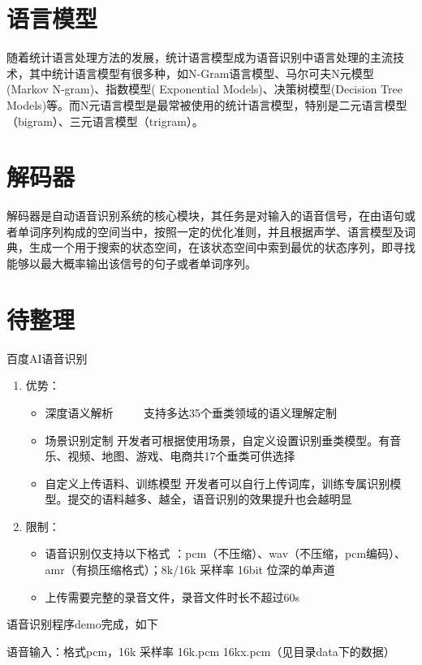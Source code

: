 \documentclass[10pt,a4paper]{ctexbook}
\begin{document}
\section{语言模型}
随着统计语言处理方法的发展，统计语言模型成为语音识别中语言处理的主流技术，其中统计语言模型有很多种，如N-Gram语言模型、马尔可夫N元模型(Markov N-gram)、指数模型( Exponential Models)、决策树模型(Decision Tree Models)等。而N元语言模型是最常被使用的统计语言模型，特别是二元语言模型（bigram）、三元语言模型（trigram）。

\section{解码器}
解码器是自动语音识别系统的核心模块，其任务是对输入的语音信号，在由语句或者单词序列构成的空间当中，按照一定的优化准则，并且根据声学、语言模型及词典，生成一个用于搜索的状态空间，在该状态空间中索到最优的状态序列，即寻找能够以最大概率输出该信号的句子或者单词序列。


\section{待整理}
百度AI语音识别
\begin{enumerate}
\item 优势：
    \begin{itemize}
    \item 深度语义解析
　　    \subitem 支持多达35个垂类领域的语义理解定制
    \item 场景识别定制
        \subitem 开发者可根据使用场景，自定义设置识别垂类模型。有音乐、视频、地图、游戏、电商共17个垂类可供选择
    \item 自定义上传语料、训练模型
        \subitem 开发者可以自行上传词库，训练专属识别模型。提交的语料越多、越全，语音识别的效果提升也会越明显
    \end{itemize}

\item 限制：
    \begin{itemize}
    \item 语音识别仅支持以下格式 ：pcm（不压缩）、wav（不压缩，pcm编码）、amr（有损压缩格式）；8k/16k 采样率 16bit 位深的单声道
    \item 上传需要完整的录音文件，录音文件时长不超过60s
    \end{itemize}
\end{enumerate}

语音识别程序demo完成，如下

语音输入：格式pcm，16k 采样率 16k.pcm 16kx.pcm（见目录data下的数据）
\end{document}
